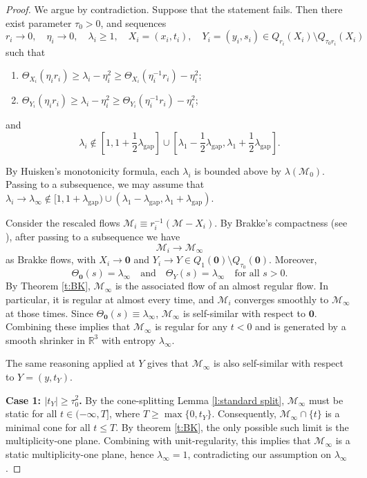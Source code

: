 \documentclass[11pt,reqno]{amsart}
\numberwithin{equation}{section}
\newcommand{\RR}{\mathds{R}}
\newcommand{\cM}{\mathcal{M}}
\theoremstyle{definition}
\theoremstyle{remark}
\theoremstyle{remark}
\theoremstyle{remark}
\theoremstyle{remark}\newtheorem{conjecture}[equation]{Conjecture}
\theoremstyle{remark}\newtheorem{question}[equation]{Question}
\begin{document}
\begin{proof}
We argue by contradiction. Suppose that the statement fails. Then there exist parameter $\tau_0>0$, and sequences
\[
r_i \to 0,\quad \eta_i \to 0,\quad \lambda_i \ge 1,\quad X_i=(x_i,t_i),\quad Y_i=(y_i,s_i)\in Q_{r_i}(X_i)\setminus Q_{\tau_0 r_i}(X_i)
\]
such that
\begin{enumerate}
    \item $\Theta_{X_i}(\eta_i r_i) \ge \lambda_i - \eta_i^2 \ge \Theta_{X_i}(\eta_i^{-1}r_i) - \eta_i^2$;
    \item $\Theta_{Y_i}(\eta_i r_i) \ge \lambda_i - \eta_i^2 \ge \Theta_{Y_i}(\eta_i^{-1}r_i) - \eta_i^2$;
\end{enumerate}
and
\[
\lambda_i \notin [1,1+\frac{1}{2}\lambda_{\mathrm{gap}}]\cup[\lambda_1-\frac{1}{2}\lambda_{\mathrm{gap}},\lambda_1+\frac{1}{2}\lambda_{\mathrm{gap}}].
\]

By Huisken’s monotonicity formula, each $\lambda_i$ is bounded above by $\lambda(\cM_0)$. Passing to a subsequence, we may assume that $\lambda_i \to \lambda_\infty \notin [1,1+\lambda_{\mathrm{gap}})\cup(\lambda_1-\lambda_{\mathrm{gap}},\lambda_1+\lambda_{\mathrm{gap}})$.


Consider the rescaled flows $\cM_i \equiv r_i^{-1}(\cM - X_i)$. By Brakke's compactness (see \cite{Bra78,Il94,BK23}), after passing to a subsequence we have
\[
\cM_i \to \cM_\infty
\]
as Brakke flows, with $X_i \to \mathbf{0}$ and $Y_i \to Y \in Q_1(\mathbf{0})\setminus Q_{\tau_0}(\mathbf{0})$. Moreover,
\[
\Theta_{\mathbf{0}}(s)=\lambda_\infty \quad\text{and}\quad \Theta_Y(s)=\lambda_\infty \quad\text{for all } s>0.
\]
By Theorem \ref{t:BK}, $\cM_\infty$ is the associated flow of an almost regular flow. In particular, it is regular at almost every time, and $\cM_i$ converges smoothly to $\cM_\infty$ at those times. Since $\Theta_{\mathbf{0}}(s)\equiv\lambda_\infty$, $\cM_\infty$ is self-similar with respect to $\mathbf{0}$. Combining these implies that $\cM_\infty$ is regular for any $t<0$ and is generated by a smooth shrinker in $\RR^3$ with entropy $\lambda_\infty$.  

The same reasoning applied at $Y$ gives that $\cM_\infty$ is also self-similar with respect to $Y=(y,t_Y)$.

\medskip\noindent
\textbf{Case 1: $|t_Y|\ge\tau_0^2$.}  
By the cone-splitting Lemma \ref{l:standard split}, $\cM_\infty$ must be static for all $t\in(-\infty,T]$, where $T\ge\max\{0,t_Y\}$. Consequently, $\cM_\infty\cap\{t\}$ is a minimal cone for all $t\le T$. By theorem \ref{t:BK}, the only possible such limit is the multiplicity-one plane. Combining with unit-regularity, this implies that $\cM_\infty$ is a static multiplicity-one plane, hence $\lambda_\infty=1$, contradicting our assumption on $\lambda_\infty$.


\end{proof}
\end{document}
